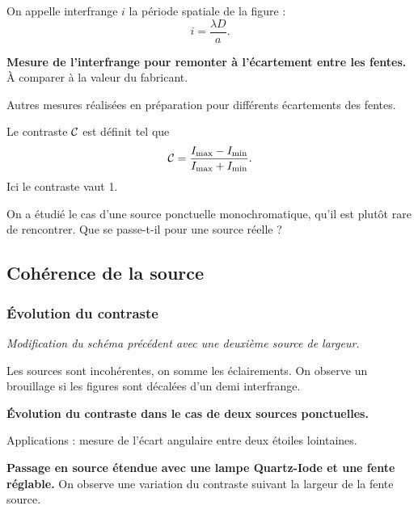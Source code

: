 On appelle interfrange $i$ la période spatiale de la figure :
\begin{equation}
i = \frac{\lambda D}{a}.
\end{equation}

\begin{experience}
\textbf{Mesure de l'interfrange pour remonter à l'écartement entre les fentes.}
À comparer à la valeur du fabricant.
\end{experience}

\begin{slide}
Autres mesures réalisées en préparation pour différents écartements des fentes.
\end{slide}

Le contraste ${\cal{C}}$ est définit tel que
\begin{equation}
{\cal{C}} = \frac{I_\mathrm{max}-I_\mathrm{min}}{I_\mathrm{max}+I_\mathrm{min}}.
\end{equation}
Ici le contraste vaut 1.

\begin{transition}
On a étudié le cas d'une source ponctuelle monochromatique, qu'il est plutôt rare de rencontrer.
Que se passe-t-il pour une source réelle ?
\end{transition}

\subsection{Cohérence de la source}

\subsubsection{Évolution du contraste}

\emph{Modification du schéma précédent avec une deuxième source de largeur.}

Les sources sont incohérentes, on somme les éclairements.
On observe un brouillage si les figures sont décalées d'un demi interfrange.

\begin{slide}
\textbf{Évolution du contraste dans le cas de deux sources ponctuelles.}
\end{slide}

Applications : mesure de l'écart angulaire entre deux étoiles lointaines.

\begin{experience}
\textbf{Passage en source étendue avec une lampe Quartz-Iode et une fente réglable.}
 On observe une variation du contraste suivant la largeur de la fente source.
\end{experience}

